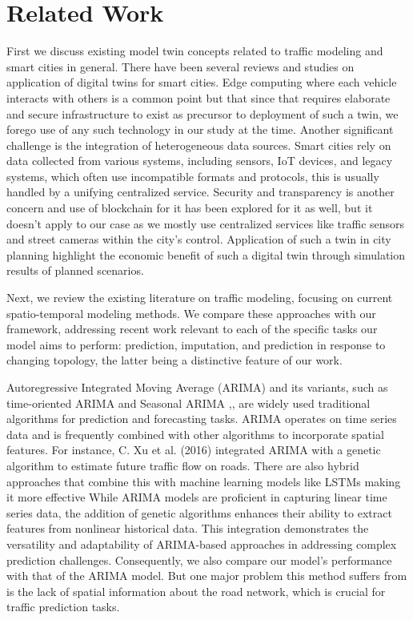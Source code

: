 \section{Related Work}\label{sec:related-works}

First we discuss existing model twin concepts related to traffic modeling and smart cities in general. There have been several reviews\cite{wang2023digital}\cite{digcity} and studies on application of digital twins for smart cities. Edge computing where each vehicle interacts with others is a common point but that since that requires elaborate and secure infrastructure to exist as precursor to deployment of such a twin, we forego use of any such technology in our study at the time. Another significant challenge is the integration of heterogeneous data sources. Smart cities rely on data collected from various systems, including sensors, IoT devices, and legacy systems, which often use incompatible formats and protocols, this is usually handled by a unifying centralized service. Security and transparency is another concern and use of blockchain\cite{matei2024artificial} for it has been explored for it as well, but it doesn't apply to our case as we mostly use centralized services like traffic sensors and street cameras within the city's control. Application of such a twin in city planning\cite{batty2024digital} highlight the economic benefit of such a digital twin through simulation results of planned scenarios.

Next, we review the existing literature on traffic modeling, focusing on current spatio-temporal modeling methods. We compare these approaches with our framework, addressing recent work relevant to each of the specific tasks our model aims to perform: prediction, imputation, and prediction in response to changing topology, the latter being a distinctive feature of our work.

Autoregressive Integrated Moving Average (ARIMA) \cite{arima} and its variants, such as time-oriented ARIMA \cite{time_arima} and Seasonal ARIMA \cite{sarima},\cite{kochetkova2023short}, are widely used traditional algorithms for prediction and forecasting tasks. ARIMA operates on time series data and is frequently combined with other algorithms to incorporate spatial features. For instance, C. Xu et al. (2016)\cite{Xu2016} integrated ARIMA with a genetic algorithm to estimate future traffic flow on roads. There are also hybrid approaches that combine this with machine learning models like LSTMs\cite{sattarzadeh2023novel} making it more effective While ARIMA models are proficient in capturing linear time series data, the addition of genetic algorithms enhances their ability to extract features from nonlinear historical data. This integration demonstrates the versatility and adaptability of ARIMA-based approaches in addressing complex prediction challenges. Consequently, we also compare our model's performance with that of the ARIMA model. But one major problem this method suffers from is the lack of spatial information about the road network, which is crucial for traffic prediction tasks.

